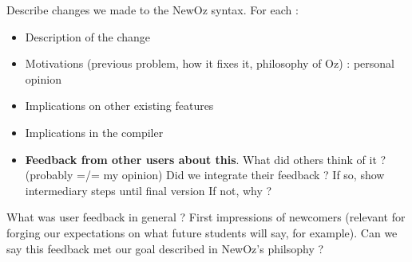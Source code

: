 
Describe changes we made to the NewOz syntax.
For each :
\begin{itemize}
    \item Description of the change
    \item Motivations (previous problem, how it fixes it, philosophy of Oz) : personal opinion
    \item Implications on other existing features
    \item Implications in the compiler
    \item \textbf{Feedback from other users about this}.
    What did others think of it ? (probably =/= my opinion)
    Did we integrate their feedback ?
    If so, show intermediary steps until final version
    If not, why ?
\end{itemize}

What was user feedback in general ?
First impressions of newcomers (relevant for forging our expectations on what future students will say, for example).
Can we say this feedback met our goal described in NewOz's philsophy ?